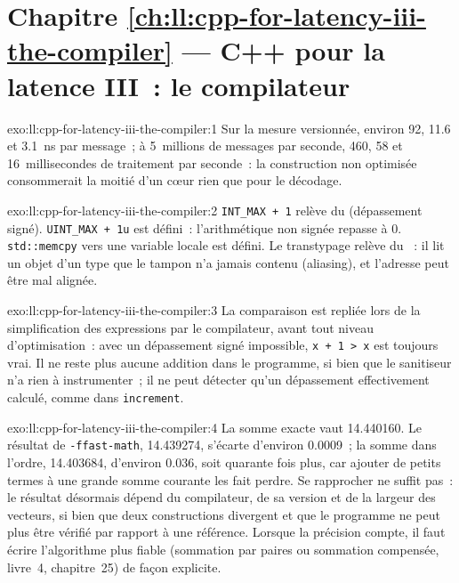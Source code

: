 \section*{Chapitre \ref{ch:ll:cpp-for-latency-iii-the-compiler} --- C++ pour la latence III~: le compilateur}

\begin{solution}{exo:ll:cpp-for-latency-iii-the-compiler:1}
Sur la mesure versionnée, environ 92, 11.6 et \qty{3.1}{\nano\second} par message~; à 5~millions de messages par seconde, 460,
58 et 16~millisecondes de traitement par seconde~: la construction non optimisée consommerait la moitié d'un cœur rien que pour le décodage.
\end{solution}

\begin{solution}{exo:ll:cpp-for-latency-iii-the-compiler:2}
\texttt{INT\_MAX + 1} relève du  (dépassement signé). \texttt{UINT\_MAX + 1u} est défini~: l'arithmétique non signée repasse à 0.
\texttt{std::memcpy} vers une variable locale est défini. Le transtypage relève du ~: il lit un objet d'un type que le tampon n'a jamais contenu
(aliasing), et l'adresse peut être mal alignée.
\end{solution}

\begin{solution}{exo:ll:cpp-for-latency-iii-the-compiler:3}
La comparaison est repliée lors de la simplification des expressions par le compilateur, avant tout niveau d'optimisation~: avec un dépassement signé impossible,
\texttt{x + 1 > x} est toujours vrai. Il ne reste plus aucune addition dans le programme, si bien que le sanitiseur n'a rien à instrumenter~;
il ne peut détecter qu'un dépassement effectivement calculé, comme dans \texttt{increment}.
\end{solution}

\begin{solution}{exo:ll:cpp-for-latency-iii-the-compiler:4}
La somme exacte vaut 14.440160. Le résultat de \texttt{-ffast-math}, 14.439274, s'écarte d'environ 0.0009~; la somme dans l'ordre, 14.403684,
d'environ 0.036, soit quarante fois plus, car ajouter de petits termes à une grande somme courante les fait perdre. Se rapprocher ne suffit pas~: le résultat désormais
dépend du compilateur, de sa version et de la largeur des vecteurs, si bien que deux constructions divergent et que le programme ne peut plus être
vérifié par rapport à une référence. Lorsque la précision compte, il faut écrire l'algorithme plus fiable (sommation par paires ou sommation compensée,
livre~4, chapitre~25) de façon explicite.
\end{solution}


